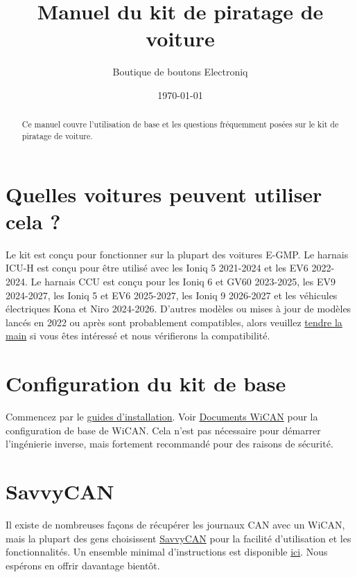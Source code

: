 \documentclass[superscriptaddress,onecolumn,floatfix]{revtex4-2}
\makeatletter
\DeclareRobustCommand{\selectlanguage}[1]{%
    \@ifundefined{alias@\string#1}
      {\ORIGselectlanguage{#1}}
      {\begingroup\edef\x{\endgroup
         \noexpand\ORIGselectlanguage{\@nameuse{alias@#1}}}\x}%
}
\makeatother
\begin{document}
\selectlanguage{fr}

\begin{abstract}
  Ce manuel couvre l'utilisation de base et les questions fréquemment posées sur le kit de piratage de voiture.
\end{abstract}
\title{Manuel du kit de piratage de voiture}
\author{Boutique de boutons Electroniq}
\date{\today}

\maketitle


\section{Quelles voitures peuvent utiliser cela ?} \label{sect:eligibility}
Le kit est conçu pour fonctionner sur la plupart des voitures E-GMP. Le harnais ICU-H est conçu pour être utilisé avec les Ioniq 5 2021-2024 et les EV6 2022-2024. Le harnais CCU est conçu pour les Ioniq 6 et GV60 2023-2025, les EV9 2024-2027, les Ioniq 5 et EV6 2025-2027, les Ioniq 9 2026-2027 et les véhicules électriques Kona et Niro 2024-2026. D'autres modèles ou mises à jour de modèles lancés en 2022 ou après sont probablement compatibles, alors veuillez \href{mailto:requests@electroniqbuttons.com}{tendre la main} si vous êtes intéressé et nous vérifierons la compatibilité. 

\section{Configuration du kit de base}
Commencez par le \href{https://github.com/tylerharvey/Ioniq5_CAN/blob/main/guides/}{guides d'installation}. Voir \href{https://meatpihq.github.io/wican-fw/config/wifi}{Documents WiCAN} pour la configuration de base de WiCAN. Cela n’est pas nécessaire pour démarrer l’ingénierie inverse, mais fortement recommandé pour des raisons de sécurité.

\section{SavvyCAN}
Il existe de nombreuses façons de récupérer les journaux CAN avec un WiCAN, mais la plupart des gens choisissent \href{https://www.savvycan.com/}{SavvyCAN} pour la facilité d’utilisation et les fonctionnalités. Un ensemble minimal d'instructions est disponible \href{https://meatpihq.github.io/wican-fw/savvycan/usage}{ici}. Nous espérons en offrir davantage bientôt.
\end{document}
